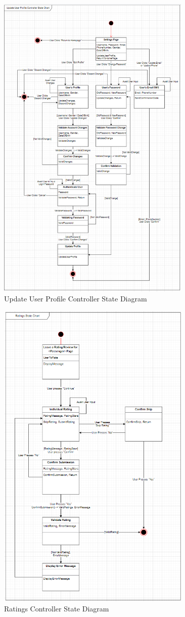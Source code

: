 \documentclass[]{article}
\begin{document}
\begin{figure}[h]
	\centering
	\includegraphics[width=25em]{assets/D3_5.PNG}
	\caption{Update User Profile Controller State Diagram}
	\label{fig:acd}
\end{figure}
\pagebreak

\begin{figure}[h]
	\centering
	\includegraphics[width=25em]{assets/D3_6.PNG}
	\caption{Ratings Controller State Diagram}
	\label{fig:acd}
\end{figure}
\pagebreak
\end{document}
